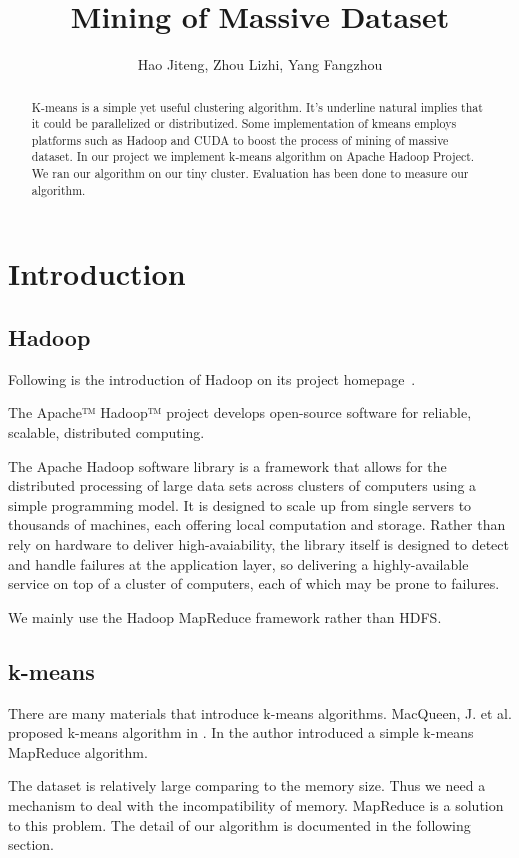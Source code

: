 \documentclass[a4paper,11pt]{article}
\title{Mining of Massive Dataset}
\author{Hao Jiteng, Zhou Lizhi, Yang Fangzhou}
\begin{document}
\maketitle

\begin{abstract}
K-means is a simple yet useful clustering algorithm. It's underline natural
implies that it could be parallelized or distributized. Some implementation of
kmeans employs platforms such as Hadoop and CUDA to boost the process of mining
of massive dataset.
In our project we implement k-means algorithm on Apache Hadoop Project. We ran
our algorithm on our tiny cluster. Evaluation has been done to measure our
algorithm.
\end{abstract}

\section{Introduction}
\subsection{Hadoop}
Following is the introduction of Hadoop on its project
homepage~\cite{apache:hadoop}.

The Apache™ Hadoop™ project develops open-source software for reliable,
scalable, distributed computing.

The Apache Hadoop software library is a framework that allows for the
distributed processing of large data sets across clusters of computers using a
simple programming model. It is designed to scale up from single servers to
thousands of machines, each offering local computation and storage. Rather than
rely on hardware to deliver high-avaiability, the library itself is designed to
detect and handle failures at the application layer, so delivering a
highly-available service on top of a cluster of computers, each of which may
be prone to failures.

We mainly use the Hadoop MapReduce framework rather than HDFS.

\subsection{k-means}
There are many materials that introduce k-means
algorithms. MacQueen, J. et al. proposed k-means algorithm in
\cite{algo:kmeans1}. In \cite{algo:kmeans2} the author introduced a simple
k-means MapReduce algorithm. 

The dataset is relatively large comparing to the memory size. Thus we need a
mechanism to deal with the incompatibility of memory. MapReduce is a solution to
this problem. The detail of our algorithm is documented in the following
section.
\end{document}
